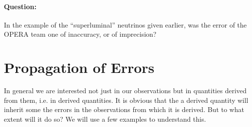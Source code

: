 \begin{question}
\paragraph{Question:} In the example of the ``superluminal'' neutrinos given earlier, was the error of the OPERA team one of inaccuracy, or of imprecision? 
\end{question}

\section{Propagation of Errors}

In general we are interested not just in our observations but in quantities derived from them, i.e. in derived quantities. It is obvious that the a derived quantity will inherit some the errors in the observations from which it is derived. But to what extent will it do so? We will use a few examples to understand this. 

